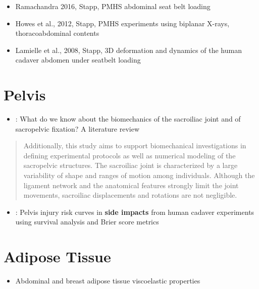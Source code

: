 \documentclass[]{book}
\providecommand{\tightlist}{%
  \setlength{\itemsep}{0pt}\setlength{\parskip}{0pt}}
\begin{document}
\begin{itemize}
\tightlist
\item
  Ramachandra 2016, Stapp, PMHS abdominal seat belt loading
\item
  Howes et al., 2012, Stapp, PMHS experiments using biplanar X-rays, thoracoabdominal contents
\item
  Lamielle et al., 2008, Stapp, 3D deformation and dynamics of the human cadaver abdomen under seatbelt loading
\end{itemize}

\hypertarget{pelvis}{%
\section{Pelvis}\label{pelvis}}

\begin{itemize}
\tightlist
\item
  \citet{Casaroli2019}: What do we know about the biomechanics of the sacroiliac joint and of sacropelvic fixation? A literature review
\end{itemize}

\begin{quote}
Additionally, this study aims to support biomechanical investigations in defining experimental protocols as well as numerical modeling of the sacropelvic structures. The sacroiliac joint is characterized by a large variability of shape and ranges of motion among individuals. Although the ligament network and the anatomical features strongly limit the joint movements, sacroiliac displacements and rotations are not negligible.
\end{quote}

\begin{itemize}
\tightlist
\item
  \citet{Yoganandan2019}: Pelvis injury risk curves in \textbf{side impacts} from human cadaver experiments using survival analysis and Brier score metrics
\end{itemize}

\hypertarget{adipose-tissue}{%
\section{Adipose Tissue}\label{adipose-tissue}}

\begin{itemize}
\tightlist
\item
  Abdominal and breast adipose tissue viscoelastic properties \citep{Calvo-Gallego2019}
\end{itemize}
\end{document}
